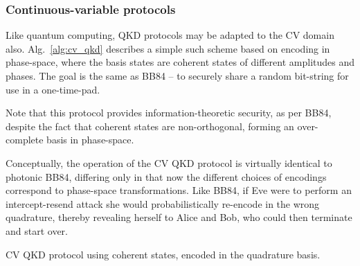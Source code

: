 \subsubsection{Continuous-variable protocols}\label{sec:CV_QKD}


Like quantum computing, QKD protocols may be adapted to the CV domain also. Alg.~\ref{alg:cv_qkd} describes a simple such scheme based on encoding in phase-space, where the basis states are coherent states of different amplitudes and phases. The goal is the same as BB84 -- to securely share a random bit-string for use in a one-time-pad.

Note that this protocol provides information-theoretic security, as per BB84, despite the fact that coherent states are non-orthogonal, forming an over-complete basis in phase-space.

Conceptually, the operation of the CV QKD protocol is virtually identical to photonic BB84, differing only in that now the different choices of encodings correspond to phase-space transformations. Like BB84, if Eve were to perform an intercept-resend attack she would probabilistically re-encode in the wrong quadrature, thereby revealing herself to Alice and Bob, who could then terminate and start over. 

\begin{table}[!htbp]
\captionspacealg \caption{CV QKD protocol using coherent states, encoded in the quadrature basis.}\label{alg:cv_qkd}
\end{table}

